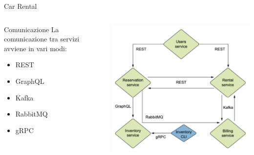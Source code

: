 \begin{frame}{Car Rental}
    \begin{columns}
        \begin{column}{.45\textwidth}
            \begin{block}{Comunicazione}
                La comunicazione tra servizi avviene in vari modi:
                \begin{itemize}
                    \item REST
                    \item GraphQL
                    \item Kafka
                    \item RabbitMQ
                    \item gRPC
                \end{itemize}
            \end{block}
            \end{column}
            \begin{column}{.55\textwidth}
                \includegraphics[width=\textwidth]{images/1-car rental/comunication.pdf}
            \end{column}
        \end{columns}
\end{frame}
